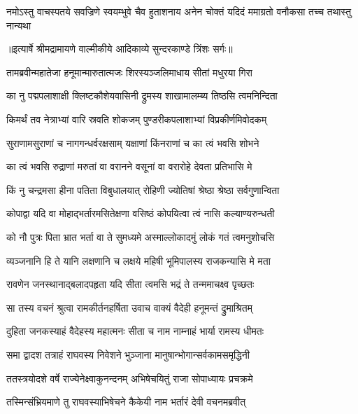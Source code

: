 \fourlineindentedshloka
{नमोऽस्तु वाचस्पतये सवज्रिणे}
{ स्वयम्भुवे चैव हुताशनाय}
{अनेन चोक्तं यदिदं ममाग्रतो}
{ वनौकसा तच्च तथास्तु नान्यथा} %


{॥इत्यार्षे श्रीमद्रामायणे वाल्मीकीये आदिकाव्ये सुन्दरकाण्डे त्रिंशः सर्गः॥}


\twolineshloka
{तामब्रवीन्महातेजा हनूमान्मारुतात्मजः}
{शिरस्यञ्जलिमाधाय सीतां मधुरया गिरा} %

\twolineshloka
{का नु पद्मपलाशाक्षी क्लिष्टकौशेयवासिनी}
{द्रुमस्य शाखामालम्ब्य तिष्ठसि त्वमनिन्दिता} %

\twolineshloka
{किमर्थं तव नेत्राभ्यां वारि स्रवति शोकजम्}
{पुण्डरीकपलाशाभ्यां विप्रकीर्णमिवोदकम्} %

\twolineshloka
{सुराणामसुराणां च नागगन्धर्वरक्षसाम्}
{यक्षाणां किंनराणां च का त्वं भवसि शोभने} %

\twolineshloka
{का त्वं भवसि रुद्राणां मरुतां वा वरानने}
{वसूनां वा वरारोहे देवता प्रतिभासि मे} %

\twolineshloka
{किं नु चन्द्रमसा हीना पतिता विबुधालयात्}
{रोहिणी ज्योतिषां श्रेष्ठा श्रेष्ठा सर्वगुणान्विता} %

\twolineshloka
{कोपाद्वा यदि वा मोहाद्भर्तारमसितेक्षणा}
{वसिष्ठं कोपयित्वा त्वं नासि कल्याण्यरुन्धती} %

\twolineshloka
{को नौ पुत्रः पिता भ्रात भर्ता वा ते सुमध्यमे}
{अस्माल्लोकादमुं लोकं गतं त्वमनुशोचसि} %

\twolineshloka
{व्यञ्जनानि हि ते यानि लक्षणानि च लक्षये}
{महिषी भूमिपालस्य राजकन्यासि मे मता} %

\twolineshloka
{रावणेन जनस्थानाद्बलादपहृता यदि}
{सीता त्वमसि भद्रं ते तन्ममाचक्ष्व पृच्छतः} %

\twolineshloka
{सा तस्य वचनं श्रुत्वा रामकीर्तनहर्षिता}
{उवाच वाक्यं वैदेही हनूमन्तं द्रुमाश्रितम्} %

\twolineshloka
{दुहिता जनकस्याहं वैदेहस्य महात्मनः}
{सीता च नाम नाम्नाहं भार्या रामस्य धीमतः} %

\twolineshloka
{समा द्वादश तत्राहं राघवस्य निवेशने}
{भुञ्जाना मानुषान्भोगान्सर्वकामसमृद्धिनी} %

\twolineshloka
{ततस्त्रयोदशे वर्षे राज्येनेक्ष्वाकुनन्दनम्}
{अभिषेचयितुं राजा सोपाध्यायः प्रचक्रमे} %

\twolineshloka
{तस्मिन्संभ्रियमाणे तु राघवस्याभिषेचने}
{कैकेयी नाम भर्तारं देवी वचनमब्रवीत्} %

